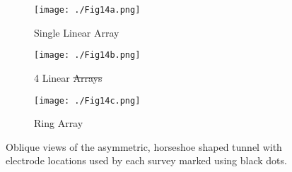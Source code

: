 \documentclass[preprint,authoryear,12pt]{elsarticle}
\providecommand{\DIFaddtex}[1]{{\protect\color{blue}\uwave{#1}}} %
\providecommand{\DIFdeltex}[1]{{\protect\color{red}\sout{#1}}}                      %
\providecommand{\DIFaddFL}[1]{\DIFadd{#1}} %
\providecommand{\DIFdelFL}[1]{\DIFdel{#1}} %
\providecommand{\DIFaddbeginFL}{} %
\providecommand{\DIFaddendFL}{} %
\providecommand{\DIFdelbeginFL}{} %
\providecommand{\DIFdelendFL}{} %
\providecommand{\DIFadd}[1]{\texorpdfstring{\DIFaddtex{#1}}{#1}} %
\providecommand{\DIFdel}[1]{\texorpdfstring{\DIFdeltex{#1}}{}} %
\begin{document}
\begin{figure}[htp]{}
   \begin{center}
      \begin{subfigure}{0.48\linewidth}
         \DIFdelbeginFL %
\DIFdelendFL \DIFaddbeginFL \texttt{[image: ./Fig14a.png]}
         \DIFaddendFL \caption{Single Linear Array}
         \label{fig:Horseshoe_SLA_Oblique}
      \end{subfigure}
      \hspace{-0.7cm}
      \qquad
      \begin{subfigure}{0.48\linewidth}
         \DIFdelbeginFL %
\DIFdelendFL \DIFaddbeginFL \texttt{[image: ./Fig14b.png]}
         \DIFaddendFL \caption{4 Linear \DIFdelbeginFL \DIFdelFL{Arrays}\DIFdelendFL \DIFaddbeginFL \DIFaddFL{Array}\DIFaddendFL }
         \label{fig:Horseshoe_4LA_Oblique}
      \end{subfigure}
      \vspace{0.4cm}

      \begin{subfigure}{0.48\linewidth}
         \DIFdelbeginFL %
\DIFdelendFL \DIFaddbeginFL \texttt{[image: ./Fig14c.png]}
         \DIFaddendFL \caption{Ring Array}
         \label{fig:Horseshoe_Ring_5mSep_Oblique}
      \end{subfigure}
   \end{center}
\vspace{-0.4cm}
\caption{Oblique views of the asymmetric, horseshoe shaped tunnel with electrode locations used by each survey marked using black dots.}
\label{fig:Horseshoe_SurveyGeometry}
\end{figure}
\end{document}
